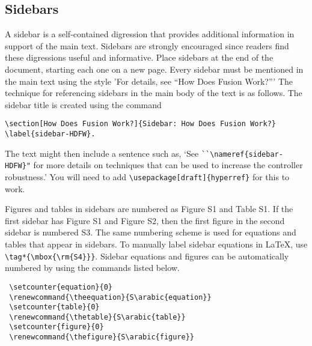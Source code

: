 \subsection{Sidebars}
A sidebar is a self-contained digression that provides additional information in support of the main text.    Sidebars are strongly encouraged since readers find these digressions useful and informative. Place sidebars at the end of the document, starting each one on a new page.
%
Every sidebar must be mentioned in the main text using the style 'For details, see ``How Does Fusion Work?'''
The technique for referencing sidebars in the main body of the text is as follows. The sidebar title is created using the command
\begin{verbatim} 
\section[How Does Fusion Work?]{Sidebar: How Does Fusion Work?}
\label{sidebar-HDFW}.
\end{verbatim} 
The text might then include a sentence such as, `See \verb!``\nameref{sidebar-HDFW}"! for more details on techniques that can be used to increase the controller robustness.' You will need to add \verb!\usepackage[draft]{hyperref}! for this to work.

Figures and tables in sidebars are numbered as Figure S1 and Table S1.   If the first sidebar has Figure S1 and Figure S2, then the first figure in the second sidebar is numbered S3.  The same numbering scheme is used for equations and tables that appear in sidebars.  
To manually label sidebar equations in LaTeX, use \verb!\tag*{\mbox{\rm{S4}}}!. Sidebar equations and figures can be automatically numbered by using the commands listed below.
 \begin{verbatim} 
 \setcounter{equation}{0}
 \renewcommand{\theequation}{S\arabic{equation}}
 \setcounter{table}{0}
 \renewcommand{\thetable}{S\arabic{table}}
 \setcounter{figure}{0}
 \renewcommand{\thefigure}{S\arabic{figure}}
\end{verbatim} 

